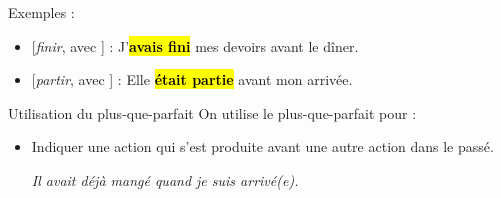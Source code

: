 Exemples :
\begin{itemize}
    \item{} [\textit{finir}, avec ] : J'\hl{\textbf{avais fini}} mes devoirs avant le dîner.
    \item{} [\textit{partir}, avec ] : Elle \hl{\textbf{était partie}} avant mon arrivée.
\end{itemize}

\begin{frbox}[violet]{Utilisation du plus-que-parfait}
    On utilise le plus-que-parfait pour :
    \begin{itemize}
        \item Indiquer une action qui s'est produite avant une autre action dans le passé.
        
        \qquad\textit{Il avait déjà mangé quand je suis arrivé(e).}
    \end{itemize}
\end{frbox}